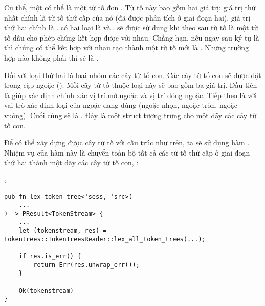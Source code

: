     Cụ thể, một  có thể là một từ tố đơn . Từ tố này bao gồm hai giá trị: giá trị thứ nhất chính là từ tố thứ cấp của nó (đã được phân tích ở giai đoạn hai), giá trị thứ hai chính là .  có hai loại là  và .  sẽ được sử dụng khi theo sau từ tố là một từ tố dấu cho phép chúng kết hợp được với nhau. Chẳng hạn, nếu ngay sau ký tự \kw{<} là \kw{=} thì chúng có thể kết hợp với nhau tạo thành một từ tố mới là \kw{<=}. Những trường hợp nào không phải  thì sẽ là .

    Đối với loại thứ hai là loại nhóm các cây từ tố con. Các cây từ tố con sẽ được đặt trong cặp ngoặc (). Mỗi cây từ tố thuộc loại này sẽ bao gồm ba giá trị. Đầu tiên là  giúp xác định chính xác vị trí mở ngoặc và vị trí đóng ngoặc. Tiếp theo là  với vai trò xác định loại của ngoặc đang dùng (ngoặc nhọn, ngoặc tròn, ngoặc vuông). Cuối cùng sẽ là . Đây là một struct tượng trưng cho một dãy các cây từ tố con.

    Để có thể xây dựng được cây từ tố với cấu trúc như trên, ta sẽ sử dụng hàm . Nhiệm vụ của hàm này là chuyển toàn bộ tất cả các từ tố thứ cấp ở giai đoạn thứ hai thành một dãy các cây từ tố con, :

\noindent {}:
\begin{lstlisting}[]
pub fn lex_token_tree<'sess, 'src>(
    ...
) -> PResult<TokenStream> {
    ...
    let (tokenstream, res) = tokentrees::TokenTreesReader::lex_all_token_trees(...);

    if res.is_err() {
        return Err(res.unwrap_err());
    }

    Ok(tokenstream)
}
\end{lstlisting}

